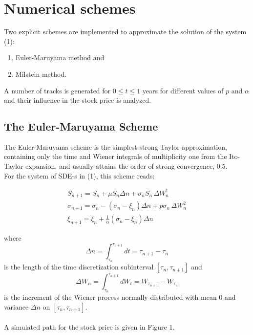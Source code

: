 \documentclass[11pt]{article}
\begin{document}

\section{Numerical schemes}

Two explicit schemes are implemented to approximate the solution of the system (1):
\begin{enumerate}
\item
Euler-Maruyama method and
\item Milstein method.
\end{enumerate}
A number of tracks is generated for $0\le t \le1$ years for different values of $p$ and $\alpha$ and their influence in the stock price is analyzed.

\subsection{The Euler-Maruyama Scheme}
The Euler-Maruyama scheme is the simplest strong Taylor approximation, containing only the time and Wiener integrals of multiplicity one from the Ito-Taylor expansion, and usually attains the order of strong convergence, 0.5.\\
For the system of SDE-s in (1), this scheme reads:

\begin{eqnarray}
\nonumber
S_{n+1} = S_n +\mu S_n \Delta n+ \sigma_n S_n \, \Delta W_n^1\\
\sigma_{n+1} = \sigma_n - (\sigma_n - \xi_n) \Delta n + p \sigma_n \, \Delta W_n^2 \\
\nonumber
\xi_{n+1} = \xi_n + \frac{1}{\alpha} (\sigma_n - \xi_n) \Delta n
\end{eqnarray}

where 
\begin{equation}
\Delta n = \int_{\tau_n}^{\tau_{n+1}} dt = \tau_{n+1} - \tau_n
\end{equation}
is the length of the time discretization subinterval $[\tau_n, \tau_{n+1}]$ and
\begin{equation}
\Delta W_n = \int_{\tau_n}^{\tau_{n+1}} dW_t = W_{\tau_{n+1}} - W_{\tau_n}
\end{equation}
is the increment of the Wiener process normally distributed with mean $0$ and variance $\Delta n$  on $[\tau_n, \tau_{n+1}]$.
\paragraph{}
A simulated path for the stock price is given in Figure 1. 
\clearpage
\end{document}
